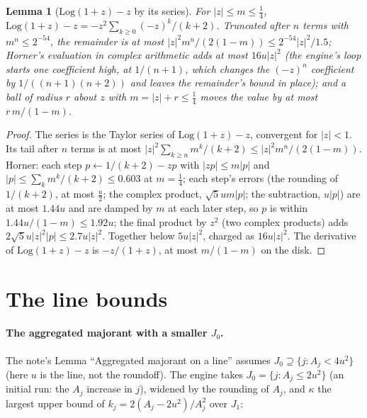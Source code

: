 \documentclass[11pt]{article}
\newtheorem{lemma}[theorem]{Lemma}
\theoremstyle{definition}
\newcommand{\Log}{\mathrm{Log}}
\begin{document}
\begin{lemma}[$\Log(1+z)-z$ by its series]\label{lem:l1pm}
For $|z|\le m\le\frac14$, $\Log(1+z)-z=-z^2\sum_{k\ge0}(-z)^k/(k+2)$. Truncated after $n$ terms with $m^n\le2^{-54}$,
the remainder is at most $|z|^2m^n/(2(1-m))\le2^{-54}|z|^2/1.5$; Horner's evaluation in complex arithmetic adds at
most $16u|z|^2$ (the engine's loop starts one coefficient high, at $1/(n+1)$, which changes the
$(-z)^n$ coefficient by $1/((n+1)(n+2))$ and leaves the remainder's bound in place); and a ball of radius $r$
about $z$ with $m=|z|+r\le\frac14$ moves the value by at most $r\,m/(1-m)$.
\end{lemma}
\begin{proof}
The series is the Taylor series of $\Log(1+z)-z$, convergent for $|z|<1$. Its tail after $n$ terms is at most
$|z|^2\sum_{k\ge n}m^k/(k+2)\le|z|^2m^n/(2(1-m))$. Horner: each step $p\leftarrow1/(k+2)-zp$ with $|zp|\le m|p|$
and $|p|\le\sum_km^k/(k+2)\le0.603$ at $m=\frac14$; each step's errors (the rounding of $1/(k+2)$, at most $\frac u2$;
the complex product, $\sqrt5um|p|$; the subtraction, $u|p|$) are at most $1.44u$ and are damped by $m$ at each later
step, so $p$ is within $1.44u/(1-m)\le1.92u$; the final product by $z^2$ (two complex products) adds
$2\sqrt5u|z|^2|p|\le2.7u|z|^2$. Together below $5u|z|^2$, charged as $16u|z|^2$. The derivative
of $\Log(1+z)-z$ is $-z/(1+z)$, at most $m/(1-m)$ on the disk.
\end{proof}

\section{The line bounds}\label{sec:lines}

\paragraph{The aggregated majorant with a smaller $J_0$.} The note's Lemma ``Aggregated majorant on a line''
assumes $J_0\supseteq\{j:A_j<4u^2\}$ (here $u$ is the line, not the roundoff). The engine takes $J_0=\{j:A_j\le
2u^2\}$ (an initial run: the $A_j$ increase in $j$), widened by the rounding of $A_j$, and $\kappa$ the largest
upper bound of $k_j=2(A_j-2u^2)/A_j^2$ over $J_1$:
\end{document}
